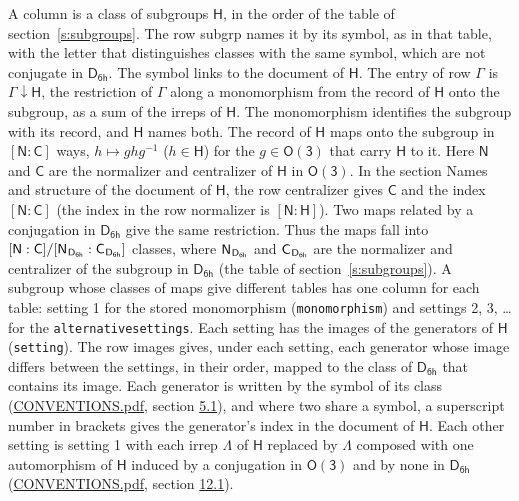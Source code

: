 \documentclass[10pt,a4paper]{article}
\numberwithin{equation}{section}
\newcommand{\grp}[1]{\mathsf{#1}}
\newcommand{\grpindex}[2]{[#1 : #2]}
\newcommand{\restr}[2]{#1\!\downarrow#2}
\newcommand{\hairsp}{\mkern1mu}
\begin{document}
A column is a class of subgroups $\grp{H}$, in the order of the table of section~\ref{s:subgroups}. The row subgrp names it by its symbol, as in that table, with the letter that distinguishes classes with the same symbol, which are not conjugate in $\grp{D_{6h}}$. The symbol links to the document of $\grp{H}$. The entry of row $\Gamma$ is $\restr{\Gamma}{\grp{H}}$, the restriction of $\Gamma$ along a monomorphism from the record of $\grp{H}$ onto the subgroup, as a sum of the irreps of $\grp{H}$. The monomorphism identifies the subgroup with its record, and $\grp{H}$ names both. \label{n:group.normalizer.o3}\label{n:group.centralizer.o3}The record of $\grp{H}$ maps onto the subgroup in $\grpindex{\grp{N}}{\grp{C}}$ ways, $h \mapsto g h g^{-1}$ ($h \in \grp{H}$) for the $g \in \grp{O(3)}$ that carry $\grp{H}$ to it. Here $\grp{N}$ and $\grp{C}$ are the normalizer and centralizer of $\grp{H}$ in \href{O3.pdf}{$\grp{O(3)}$}. In the section Names and structure of the document of $\grp{H}$, the row centralizer gives $\grp{C}$ and the index $\grpindex{\grp{N}}{\grp{C}}$ (the index in the row normalizer is $\grpindex{\grp{N}}{\grp{H}}$). Two maps related by a conjugation in $\grp{D_{6h}}$ give the same restriction. Thus the maps fall into $\grpindex{\grp{N}}{\grp{C}}/\grpindex{\grp{N}_{\hairsp \grp{D_{6h}}}}{\grp{C}_{\hairsp \grp{D_{6h}}}}$ classes, where $\grp{N}_{\hairsp \grp{D_{6h}}}$ and $\grp{C}_{\hairsp \grp{D_{6h}}}$ are the normalizer and centralizer of the subgroup in $\grp{D_{6h}}$ (the table of section~\ref{s:subgroups}). \label{n:head.setting}A subgroup whose classes of maps give different tables has one column for each table: setting 1 for the stored monomorphism (\texttt{monomorphism}) and settings 2, 3, \dots{} for the \texttt{alternativesettings}. Each setting has the images of the generators of $\grp{H}$ (\texttt{setting}). \label{n:head.images}The row images gives, under each setting, each generator whose image differs between the settings, in their order, mapped to the class of $\grp{D_{6h}}$ that contains its image. \label{n:element.generator.index}Each generator is written by the symbol of its class (\href{../../CONVENTIONS.pdf}{CONVENTIONS.pdf}, section \href{../../CONVENTIONS.pdf\#conv.5.1}{5.1}), and where two share a symbol, a superscript number in brackets gives the generator's index in the document of $\grp{H}$. \label{n:irrep.Delta}Each other setting is setting 1 with each irrep $\Lambda$ of $\grp{H}$ replaced by $\Lambda$ composed with one automorphism of $\grp{H}$ induced by a conjugation in \href{O3.pdf}{$\grp{O(3)}$} and by none in $\grp{D_{6h}}$ (\href{../../CONVENTIONS.pdf}{CONVENTIONS.pdf}, section \href{../../CONVENTIONS.pdf\#conv.12.1}{12.1}).
\end{document}
